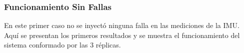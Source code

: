 
\subsubsection{Funcionamiento Sin Fallas}


En este primer caso no se inyectó ninguna falla en las mediciones de la IMU. Aquí se presentan los primeros resultados y se muestra el funcionamiento del sistema conformado por las 3 réplicas.


